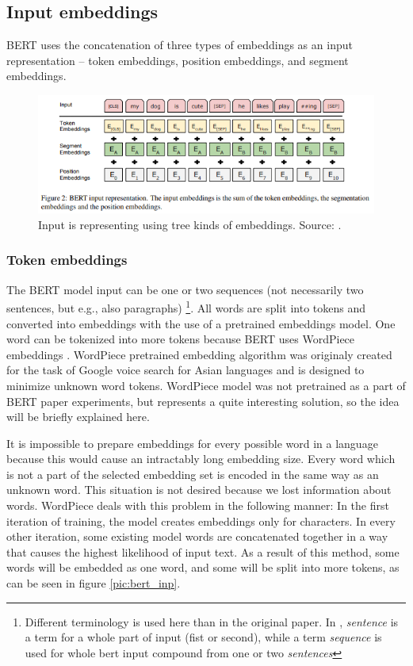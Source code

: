\subsection{Input embeddings}
BERT uses the concatenation of three types of embeddings as an input representation -- token embeddings, position embeddings, and segment embeddings. %

\begin{figure}[h]
\centering
\includegraphics[width=1\columnwidth]{../img/bert_embeddings}
\protect\caption{ Input is representing using tree kinds of embeddings.
Source: \textit{\citep{Devlin2019}}.}
\label{pic:bert_emb}
\end{figure}

\subsubsection*{Token embeddings}
The BERT model input can be one or two sequences (not necessarily two sentences, but e.g., also paragraphs) \footnote{Different terminology is used here than in the original paper. In \citep{Devlin2019}, \textit{sentence} is a term for a whole part of input (fist or second), while a term \textit{sequence} is used for whole bert input compound from one or two \textit{sentences}}. All words are split into tokens and converted into embeddings with the use of a pretrained embeddings model. One word can be tokenized into more tokens because BERT uses WordPiece %
embeddings \citep{Wu2016}. WordPiece pretrained embedding algorithm was originaly created for the task of Google voice search for Asian languages and is designed to minimize unknown word tokens. %
WordPiece model was not pretrained as a part of BERT paper experiments, but represents a quite interesting solution, so the idea will be briefly explained here.

It is impossible to prepare embeddings for every possible word in a language because this would cause an intractably long embedding size. Every word which is not a part of the selected embedding set is encoded in the same way as an unknown word. This situation is not desired because we lost information about words. WordPiece deals with this problem in the following manner: In the first iteration of training, the model creates embeddings only for characters. In every other iteration, some existing model words are concatenated together in a way that causes the highest likelihood of input text. As a result of this method, some words will be embedded as one word, and some will be split into more tokens, as can be seen in figure \ref{pic:bert_inp}.

